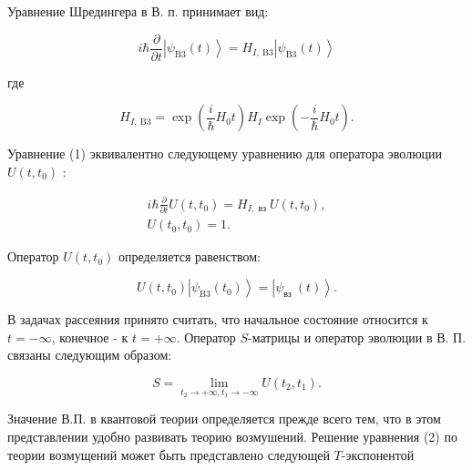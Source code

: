 \documentclass[10pt]{article}
\begin{document}
Уравнение Шредингера в В. п. принимает вид:



\[

i \hbar \frac{\partial}{\partial t}\left|\psi_{\mathrm{B} 3}(t)\right\rangle=H_{I, \mathrm{~B} 3}\left|\psi_{\mathrm{B} 3}(t)\right\rangle

\]



где



\[

H_{I, \mathrm{~B} 3}=\exp \left(\frac{i}{\hbar} H_{0} t\right) H_{I} \exp \left(-\frac{i}{\hbar} H_{0} t\right) .

\]



Уравнение (1) эквивалентно следующему уравнению для оператора эволюции $U\left(t, t_{0}\right)$ :



\[

\begin{gathered}

i \hbar \frac{\partial}{\partial t} U\left(t, t_{0}\right)=H_{I, \text { вз }} U\left(t, t_{0}\right), \\

U\left(t_{0}, t_{0}\right)=1 .

\end{gathered}

\]



Оператор $U\left(t, t_{0}\right)$ определяется равенством:



\[

U\left(t, t_{0}\right)\left|\psi_{\mathrm{B} 3}\left(t_{0}\right)\right\rangle=\left|\psi_{\text {вз }}(t)\right\rangle .

\]



В задачах рассеяния принято считать, что начальное состояние относится к $t=-\infty$, конечное - к $t=+\infty$. Оператор $S$-матрицы и оператор эволюции в В. П. связаны следующим образом:



\[

S=\lim _{t_{2} \rightarrow+\infty, t_{1} \rightarrow-\infty} U\left(t_{2}, t_{1}\right) .

\]



Значение В.П. в квантовой теории определяется прежде всего тем, что в этом представлении удобно развивать теорию возмушений. Решение уравнения (2) по теории возмущений может быть представлено следующей $T$-экспонентой
\end{document}
